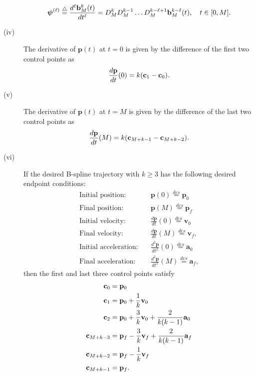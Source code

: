 \begin{corollary}
\begin{description}
\[			\boldsymbol{\psi}^{(\ell)} \stackrel{\triangle}{=} \frac{d^{\ell}\mathbf{b}_M^k(t)}{dt^{\ell}} = D_M^k D_M^{k-1} \dots D_M^{k-\ell+1} \mathbf{b}_M^{k-\ell}(t), \quad t\in [0, M].
		\]
	\item[(iv)] The derivative of $\mathbf{p}(t)$ at $t=0$ is given by the difference of the first two control points as
		\[
			\frac{d\mathbf{p}}{dt}(0) = k(\mathbf{c}_1 - \mathbf{c}_0).
		\]
	\item[(v)] The derivative of $\mathbf{p}(t)$ at $t=M$ is given by the difference of the last two control points as
		\[
			\frac{d\mathbf{p}}{dt}(M) = k(\mathbf{c}_{M+k-1} - \mathbf{c}_{M+k-2}).
		\]
	\item[(vi)] If the desired B-spline trajectory with $k\geq 3$ has the following desired endpoint conditions:
		\begin{align*}
			\text{Initial position:} &\quad \mathbf{p}(0) \stackrel{des}{=} \mathbf{p}_0 \\	
			\text{Final position:} &\quad \mathbf{p}(M) \stackrel{des}{=} \mathbf{p}_f \\
			\text{Initial velocity:} &\quad \frac{d\mathbf{p}}{dt}(0) \stackrel{des}{=} \mathbf{v}_0 \\	
			\text{Final velocity:} &\quad \frac{d\mathbf{p}}{dt}(M) \stackrel{des}{=} \mathbf{v}_f, \\
			\text{Initial acceleration:} &\quad \frac{d^2\mathbf{p}}{dt^2}(0) \stackrel{des}{=} \mathbf{a}_0 \\	
			\text{Final acceleration:} &\quad \frac{d^2\mathbf{p}}{dt^2}(M) \stackrel{des}{=} \mathbf{a}_f,
		\end{align*}
		then the first and last three control points satisfy
		\begin{align*}
			\mathbf{c}_0 &= \mathbf{p}_0 \\
			\mathbf{c}_1 &= \mathbf{p}_0 + \frac{1}{k} \mathbf{v}_0 \\
			\mathbf{c}_2 &= \mathbf{p}_0 + \frac{3}{k} \mathbf{v}_0 + \frac{2}{k(k-1)}\mathbf{a}_0 \\
			\mathbf{c}_{M+k-3} &= \mathbf{p}_f - \frac{3}{k}\mathbf{v}_f + \frac{2}{k(k-1)}\mathbf{a}_f \\
			\mathbf{c}_{M+k-2} &= \mathbf{p}_f - \frac{1}{k}\mathbf{v}_f \\
			\mathbf{c}_{M+k-1} &= \mathbf{p}_f.
		\end{align*}
	\end{description}
\end{corollary}



